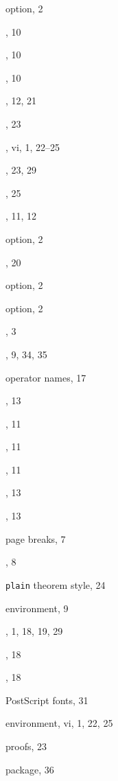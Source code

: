 \documentclass[leqno,titlepage,openany]{amsldoc}
\begin{document}
\begin{theindex}
  \indexspace

  \item {} option, 2
  \item {}, 10
  \item {}, 10
  \item {}, 10
  \item {}, 12, 21
  \item {}, 23
  \item {}, vi, 1, 22--25
  \item {}, 23, 29
  \item {}, 25
  \item {}, 11, 12
  \item {} option, 2
  \item {}, 20
  \item {} option, 2
  \item {} option, 2
  \item {}, 3
  \item {}, 9, 34, 35

  \indexspace

  \item operator names, 17
  \item {}, 13
  \item {}, 11
  \item {}, 11
  \item {}, 11
  \item {}, 13
  \item {}, 13

  \indexspace

  \item page breaks, 7
  \item {}, 8
  \item \texttt{plain} theorem style, 24
  \item {} environment, 9
  \item {}, 1, 18, 19, 29
  \item {}, 18
  \item {}, 18
  \item PostScript fonts, 31
  \item {} environment, vi, 1, 22, 25
  \item proofs, 23
  \item {} package, 36


\end{theindex}
\end{document}
